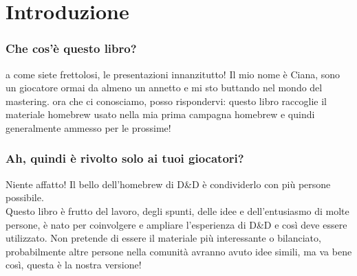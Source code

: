 \chapter{Introduzione}

\subsection{Che cos'è questo libro?}

a come siete frettolosi, le presentazioni innanzitutto! Il mio nome è Ciana, sono un giocatore ormai da almeno un annetto e mi sto buttando nel mondo del mastering. ora che ci conosciamo, posso rispondervi: questo libro raccoglie il materiale homebrew usato nella mia prima campagna homebrew e quindi generalmente ammesso per le prossime!

\subsection{Ah, quindi è rivolto solo ai tuoi giocatori?}

Niente affatto! Il bello dell'homebrew di D\&D è condividerlo con più persone possibile. \\ Questo libro è frutto del lavoro, degli spunti, delle idee e dell'entusiasmo di molte persone, è nato per coinvolgere e ampliare l'esperienza di D\&D e così deve essere utilizzato. Non pretende di essere il materiale più interessante o bilanciato, probabilmente altre persone nella comunità avranno avuto idee simili, ma va bene così, questa è la nostra versione!
